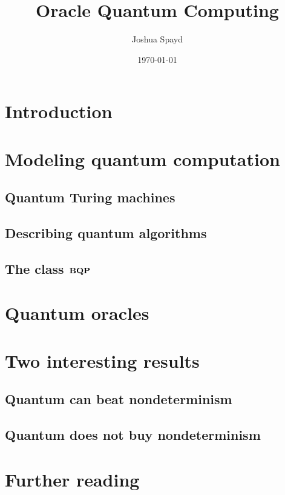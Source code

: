 \documentclass[table]{article}
\title{Oracle Quantum Computing}
\author{Joshua Spayd}
\date{\today}
\begin{document}
\maketitle
\begin{multicols}{2}

\section{Introduction}



\section{Modeling quantum computation}


\subsection{Quantum Turing machines}

\subsection{Describing quantum algorithms}

\subsection{The class $\mathbf{BQP}$}



\section{Quantum oracles}

\section{Two interesting results}

\subsection{Quantum can beat nondeterminism \cite{BB92}}

\subsection{Quantum does not buy nondeterminism \cite{BBBV97}}


\section{Further reading}


\nocite{*}



\end{multicols}
\end{document}
